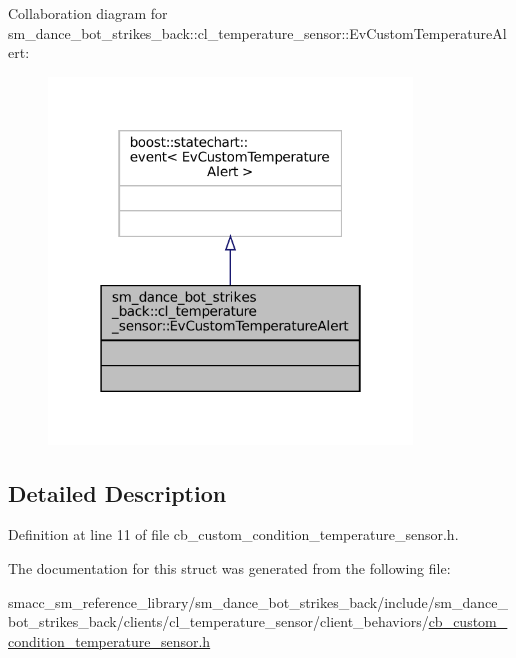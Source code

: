 Collaboration diagram for sm\+\_\+dance\+\_\+bot\+\_\+strikes\+\_\+back\+:\+:cl\+\_\+temperature\+\_\+sensor\+:\+:Ev\+Custom\+Temperature\+Alert\+:
\nopagebreak
\begin{figure}[H]
\begin{center}
\leavevmode
\includegraphics[width=274pt]{structsm__dance__bot__strikes__back_1_1cl__temperature__sensor_1_1EvCustomTemperatureAlert__coll__graph}
\end{center}
\end{figure}


\subsection{Detailed Description}


Definition at line 11 of file cb\+\_\+custom\+\_\+condition\+\_\+temperature\+\_\+sensor.\+h.



The documentation for this struct was generated from the following file\+:\begin{DoxyCompactItemize}
\item 
smacc\+\_\+sm\+\_\+reference\+\_\+library/sm\+\_\+dance\+\_\+bot\+\_\+strikes\+\_\+back/include/sm\+\_\+dance\+\_\+bot\+\_\+strikes\+\_\+back/clients/cl\+\_\+temperature\+\_\+sensor/client\+\_\+behaviors/\hyperlink{strikes__back_2include_2sm__dance__bot__strikes__back_2clients_2cl__temperature__sensor_2client_eb3f092c103b572cfc308a919200832c}{cb\+\_\+custom\+\_\+condition\+\_\+temperature\+\_\+sensor.\+h}\end{DoxyCompactItemize}
